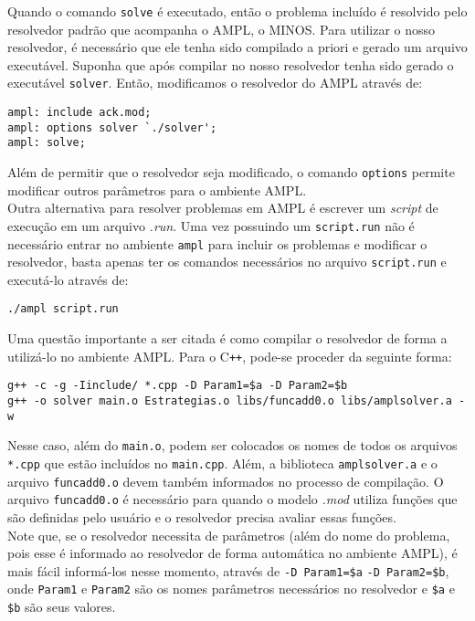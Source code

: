 \documentclass[a4paper, 12pt]{article}
\begin{document}
Quando o comando \verb|solve| é executado, então o problema incluído é resolvido pelo resolvedor padrão que acompanha o AMPL, o MINOS. Para utilizar o nosso resolvedor, é necessário que ele tenha sido compilado a priori e gerado um arquivo executável. Suponha que após compilar no nosso resolvedor tenha sido gerado o executável \verb|solver|. Então, modificamos o resolvedor do AMPL através de:
\begin{verbatim}
ampl: include ack.mod;
ampl: options solver `./solver';
ampl: solve;
\end{verbatim}

Além de permitir que o resolvedor seja modificado, o comando \verb|options| permite modificar outros parâmetros para o ambiente AMPL.\\

Outra alternativa para resolver problemas em AMPL é escrever um \textit{script} de execução em um arquivo \textit{.run}. Uma vez possuindo um \verb|script.run| não é necessário entrar no ambiente \verb|ampl| para incluir os problemas e modificar o resolvedor, basta apenas ter os comandos necessários no arquivo \verb|script.run| e executá-lo através de:
\begin{verbatim}
./ampl script.run
\end{verbatim}

Uma questão importante a ser citada é como compilar o resolvedor de forma a utilizá-lo no ambiente AMPL. Para o C\verb|++|, pode-se proceder da seguinte forma:
\begin{verbatim}
g++ -c -g -Iinclude/ *.cpp -D Param1=$a -D Param2=$b
g++ -o solver main.o Estrategias.o libs/funcadd0.o libs/amplsolver.a -w  
\end{verbatim}

Nesse caso, além do \verb|main.o|, podem ser colocados os nomes de todos os arquivos \verb|*.cpp| que estão incluídos no \verb|main.cpp|. Além, a biblioteca \verb|amplsolver.a| e o arquivo \verb|funcadd0.o| devem também informados no processo de compilação. O arquivo \verb|funcadd0.o| é necessário para quando o modelo \textit{.mod} utiliza funções que são definidas pelo usuário e o resolvedor precisa avaliar essas funções. \\

Note que, se o resolvedor necessita de parâmetros (além do nome do problema, pois esse é informado ao resolvedor de forma automática no ambiente AMPL), é mais fácil informá-los nesse momento, através de \verb|-D Param1=$a| \verb|-D Param2=$b|, onde \verb|Param1| e \verb|Param2| são os nomes parâmetros necessários no resolvedor e \verb|$a| e \verb|$b| são seus valores.
\end{document}
